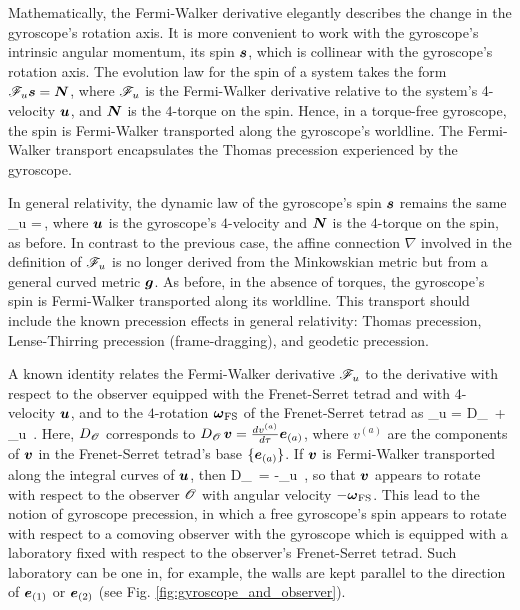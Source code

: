 \documentclass[12pt]{article}
\begin{document}
Mathematically, the Fermi-Walker derivative elegantly describes the change in the gyroscope's rotation axis. It is more convenient to work with the gyroscope's intrinsic angular momentum, its spin $\boldsymbol{s}$, which is collinear with the gyroscope's rotation axis. The evolution law for the spin of a system takes the form $\mathscr{F}_u \boldsymbol{s}=\boldsymbol{N}$, where $\mathscr{F}_u$ is the Fermi-Walker derivative relative to the system's 4-velocity $\boldsymbol{u}$, and $\boldsymbol{N}$ is the $4$-torque on the spin. Hence, in a torque-free gyroscope, the spin is Fermi-Walker transported along the gyroscope's worldline. The Fermi-Walker transport encapsulates the Thomas precession experienced by the gyroscope. 


In general relativity, the dynamic law of the gyroscope's spin $\boldsymbol{s}$ remains the same \cite{straumann2004general}
\be
\Fermi_u =\,,
\ee
where $\boldsymbol{u}$ is the gyroscope's $4$-velocity and $\boldsymbol{N}$ is the $4$-torque on the spin, as before. In contrast to the previous case, the affine connection $\nabla$ involved in the definition of $\mathscr{F}_u$ is no longer derived from the Minkowskian metric but from a general curved metric $\boldsymbol{g}$. As before, in the absence of torques, the gyroscope's spin is Fermi-Walker transported along its worldline. This transport should include the known precession effects in general relativity: Thomas precession, Lense-Thirring precession (frame-dragging), and geodetic precession.

A known identity relates the Fermi-Walker derivative $\mathscr{F}_u$ to the derivative with respect to the observer equipped with the Frenet-Serret tetrad and with 4-velocity $\boldsymbol{u}$, and to the $4$-rotation $\boldsymbol{\omega}_{\rm FS}$ of the Frenet-Serret tetrad as \cite{straumann2004general, gourgoulhon2013special}
\be
	\Fermi_u = D_\Obs\,  + \wfs \cross_u \,.
\ee
Here, $D_{\mathscr{O}}$ corresponds to $D_{\mathscr{O}}\,\boldsymbol{v}=\frac{dv^{(a)}}{d\tau}\boldsymbol{e}_{(a)}$, where $v^{(a)}$ are the components of $\boldsymbol{v}$ in the Frenet-Serret tetrad's base $\{\boldsymbol{e}_{(a)}\}$. If $\boldsymbol{v}$ is Fermi-Walker transported along the integral curves of $\boldsymbol{u}$, then
\be
	D_\Obs\,  = -\wfs \cross_u \,,
\ee
so that $\boldsymbol{v}$ appears to rotate with respect to the observer $\mathscr{O}$ with angular velocity $-\boldsymbol{\omega}_{\rm FS}$. This lead to the notion of gyroscope precession, in which a free gyroscope's spin appears to rotate with respect to a comoving observer with the gyroscope which is equipped with a laboratory fixed with respect to the observer's Frenet-Serret tetrad. Such laboratory can be one in, for example, the walls are kept parallel to the direction of $\boldsymbol{e}_{(1)}$ or $\boldsymbol{e}_{(2)}$ (see Fig. \ref{fig:gyroscope_and_observer}).
\end{document}
